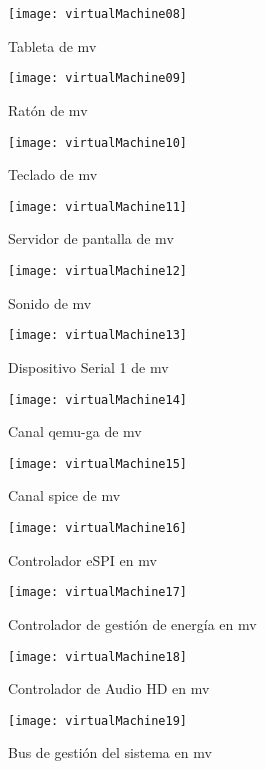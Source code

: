 \begin{figure}[!ht]
  \caption{Tableta de \acrshort{mv}}
  \centering
  \texttt{[image: virtualMachine08]}
\end{figure}
\newpage
\begin{figure}[!ht]
  \caption{Ratón de \acrshort{mv}}
  \centering
  \texttt{[image: virtualMachine09]}
\end{figure}
\begin{figure}[!ht]
  \caption{Teclado de \acrshort{mv}}
  \centering
  \texttt{[image: virtualMachine10]}
\end{figure}
\newpage
\begin{figure}[!ht]
  \caption{Servidor de pantalla de \acrshort{mv}}
  \centering
  \texttt{[image: virtualMachine11]}
\end{figure}
\begin{figure}[!ht]
  \caption{Sonido de \acrshort{mv}}
  \centering
  \texttt{[image: virtualMachine12]}
\end{figure}
\newpage
\begin{figure}[!ht]
  \caption{Dispositivo Serial 1 de \acrshort{mv}}
  \centering
  \texttt{[image: virtualMachine13]}
\end{figure}
\begin{figure}[!ht]
  \caption{Canal qemu-ga de \acrshort{mv}}
  \centering
  \texttt{[image: virtualMachine14]}
\end{figure}
\newpage
\begin{figure}[!ht]
  \caption{Canal spice de \acrshort{mv}}
  \centering
  \texttt{[image: virtualMachine15]}
\end{figure}
\begin{figure}[!ht]
  \caption{Controlador eSPI en \acrshort{mv}}
  \centering
  \texttt{[image: virtualMachine16]}
\end{figure}
\newpage
\begin{figure}[!ht]
  \caption{Controlador de gestión de energía en \acrshort{mv}}
  \centering
  \texttt{[image: virtualMachine17]}
\end{figure}
\begin{figure}[!ht]
  \caption{Controlador de Audio HD en \acrshort{mv}}
  \centering
  \texttt{[image: virtualMachine18]}
\end{figure}
\newpage
\begin{figure}[!ht]
  \caption{Bus de gestión del sistema en \acrshort{mv}}
  \centering
  \texttt{[image: virtualMachine19]}
\end{figure}
